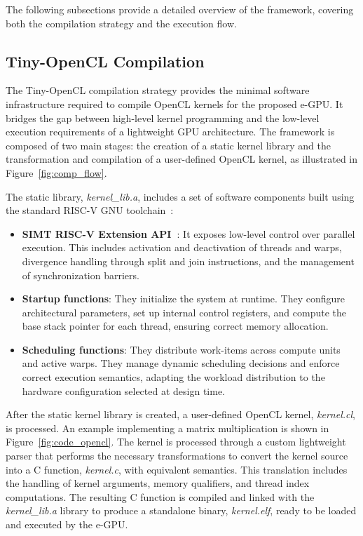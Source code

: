         The following subsections provide a detailed overview of the framework, covering both the compilation strategy and the execution flow.
    
        \subsection{Tiny-OpenCL Compilation}
        
            The \mbox{Tiny-OpenCL} compilation strategy provides the minimal software infrastructure required to compile OpenCL kernels for the proposed \mbox{e-GPU}. It bridges the gap between high-level kernel programming and the low-level execution requirements of a lightweight GPU architecture. The framework is composed of two main stages: the creation of a static kernel library and the transformation and compilation of a user-defined OpenCL kernel, as illustrated in Figure~\ref{fig:comp_flow}.
    
            The static library, \emph{kernel\_lib.a}, includes a set of software components built using the standard RISC-V GNU toolchain~\cite{riscv_toolchain}:

            \vspace{-1em}
            \begin{itemize}
                \item \textbf{SIMT RISC-V Extension API~\cite{vortex}}: It exposes low-level control over parallel execution. This includes activation and deactivation of threads and warps, divergence handling through split and join instructions, and the management of synchronization barriers.
                
                \item \textbf{Startup functions}: They initialize the system at runtime. They configure architectural parameters, set up internal control registers, and compute the base stack pointer for each thread, ensuring correct memory allocation.

                \item \textbf{Scheduling functions}: They distribute work-items across compute units and active warps. They manage dynamic scheduling decisions and enforce correct execution semantics, adapting the workload distribution to the hardware configuration selected at design time.
            \end{itemize}
            \vspace{-1em}

            After the static kernel library is created, a user-defined OpenCL kernel, \emph{kernel.cl}, is processed. An example implementing a matrix multiplication is shown in Figure~\ref{fig:code_opencl}. The kernel is processed through a custom lightweight parser that performs the necessary transformations to convert the kernel source into a C function, \emph{kernel.c}, with equivalent semantics. This translation includes the handling of kernel arguments, memory qualifiers, and thread index computations. The resulting C function is compiled and linked with the \emph{kernel\_lib.a} library to produce a standalone binary, \emph{kernel.elf}, ready to be loaded and executed by the \mbox{e-GPU}.

